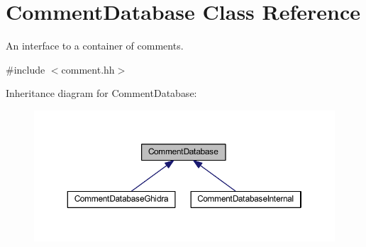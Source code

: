 \hypertarget{class_comment_database}{}\section{Comment\+Database Class Reference}
\label{class_comment_database}


An interface to a container of comments.  




{\ttfamily \#include $<$comment.\+hh$>$}



Inheritance diagram for Comment\+Database\+:
\nopagebreak
\begin{figure}[H]
\begin{center}
\leavevmode
\includegraphics[width=350pt]{class_comment_database__inherit__graph}
\end{center}
\end{figure}
